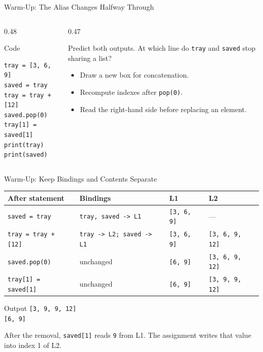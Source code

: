 \documentclass[aspectratio=169,10pt]{beamer}
\begin{document}
\begin{frame}[fragile]{Warm-Up: The Alias Changes Halfway Through}
  \begin{columns}[T,onlytextwidth]
    \begin{column}{0.48\textwidth}
      \begin{block}{Code}
\begin{verbatim}
tray = [3, 6, 9]
saved = tray
tray = tray + [12]
saved.pop(0)
tray[1] = saved[1]
print(tray)
print(saved)
\end{verbatim}
      \end{block}
    \end{column}
    \begin{column}{0.47\textwidth}
      \begin{activity}
        Predict both outputs. At which line do \texttt{tray} and \texttt{saved} stop sharing a list?
      \end{activity}
      \begin{itemize}
        \item Draw a new box for concatenation.
        \item Recompute indexes after \texttt{pop(0)}.
        \item Read the right-hand side before replacing an element.
      \end{itemize}
    \end{column}
  \end{columns}
\end{frame}

\begin{frame}{Warm-Up: Keep Bindings and Contents Separate}
  \begin{center}
    \small
    \renewcommand{\arraystretch}{1.3}
    \begin{tabular}{l|l|l|l}
      \textbf{After statement} & \textbf{Bindings} & \textbf{L1} & \textbf{L2} \\\hline
      \texttt{saved = tray} & \texttt{tray, saved -> L1} & \texttt{[3, 6, 9]} & --- \\
      \texttt{tray = tray + [12]} & \texttt{tray -> L2; saved -> L1} & \texttt{[3, 6, 9]} & \texttt{[3, 6, 9, 12]} \\
      \texttt{saved.pop(0)} & unchanged & \texttt{[6, 9]} & \texttt{[3, 6, 9, 12]} \\
      \texttt{tray[1] = saved[1]} & unchanged & \texttt{[6, 9]} & \texttt{[3, 9, 9, 12]}
    \end{tabular}
  \end{center}
  \begin{block}{Output}
    \texttt{[3, 9, 9, 12]}\\
    \texttt{[6, 9]}
  \end{block}
  After the removal, \texttt{saved[1]} reads \texttt{9} from L1. The assignment writes that value into index 1 of L2.
\end{frame}
\end{document}
